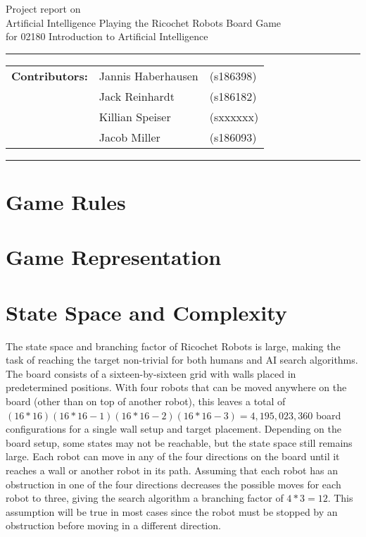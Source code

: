 \documentclass[a4paper,10pt]{article}
\begin{document}
\begin{center}
Project report on\\
\vspace{0.5cm}
{{\Large \sc Artificial Intelligence Playing the Ricochet Robots Board Game}}\\
\vspace{0.5cm} for 02180 Introduction to Artificial Intelligence
\end{center}
\rule{\textwidth}{0.5pt}
\begin{description}
\item\begin{tabular}{rll}
    \textbf{Contributors:}& Jannis Haberhausen &(s186398)\\ & Jack Reinhardt &(s186182)\\ & Killian Speiser &(sxxxxxx)\\ & Jacob Miller &(s186093) \\
\end{tabular}
\end{description}
\rule{\textwidth}{1pt}

\tableofcontents
\thispagestyle{empty}
\newpage
\section{Game Rules}


\section{Game Representation}


\section{State Space and Complexity}
The state space and branching factor of Ricochet Robots is large, making the task of reaching the target non-trivial for both humans and AI search algorithms.
The board consists of a sixteen-by-sixteen grid with walls placed in predetermined positions.  With four robots that can be moved anywhere on the board (other
than on top of another robot), this leaves a total of $(16*16)(16*16-1)(16*16-2)(16*16-3) = 4,195,023,360$ board configurations for a single wall setup and
target placement.  Depending on the board setup, some states may not be reachable, but the state space still remains large. Each robot can move in any of the
four directions on the board until it reaches a wall or another robot in its path.  Assuming that each robot has an obstruction in one of the four directions
decreases the possible moves for each robot to three, giving the search algorithm a branching factor of $4*3 = 12$.  This assumption will be true in most cases since
the robot must be stopped by an obstruction before moving in a different direction. \\
\end{document}
